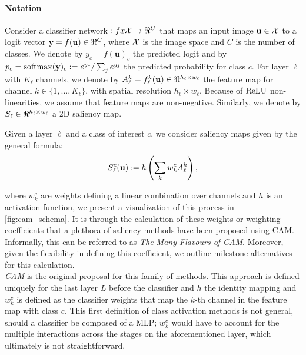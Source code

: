 \paragraph{Notation}
\label{sec:oc_notation}
Consider a classifier network $:fx \cX \to \real^C$ that maps an input image $\mathbf{u} \in \mathcal{X}$ to a 
logit vector $\vy = f(\mathbf{u}) \in \real^C$, where $\mathcal{X}$ is the image space and $C$ is the number 
of classes. We denote by $y_c = f(\mathbf{u})_c$ the predicted logit and by $p_c = \operatorname{softmax}(\mathbf{y})_c 
\mathrel{:=} e^{y_c} / \sum_j e^{y_j}$ the predicted probability for class $c$. For layer $\ell$ 
with $K_\ell$ channels, we denote by $A^k_\ell = f^k_\ell(\mathbf{u}) \in \real^{h_\ell \times w_\ell}$ 
the feature map for channel $k \in \{1,\dots,K_\ell\}$, with spatial resolution $h_\ell \times 
w_\ell$. Because of ${\operatorname{ReLU}}$ non-linearities, we assume that feature maps are non-negative. 
Similarly, we denote by $S_\ell \in \real^{h_\ell \times w_\ell}$ a 2D saliency map.

\label{sec:oc_back}
Given a layer $\ell$ and a class of interest $c$, we consider saliency maps given by the general 
formula: \\
\begin{equation}
	S^c_\ell(\mathbf{u}) \mathrel{:=} h \left( \sum_k w^c_k A^k_\ell \right),
\label{eq:sal}
\end{equation}

where $w^c_k$ are weights defining a linear combination over channels and $h$ is an activation 
function, we present a visualization of this process in \autoref{fig:cam_schema}. It is through the 
calculation of these weights or weighting coefficients that a plethora of saliency methods have 
been proposed using CAM. Informally, this can be referred to as \emph{The Many Flavours of CAM}.
Moreover, given the flexibility in defining this coefficient, we outline milestone alternatives for 
this calculation.\\



\noindent \emph{CAM} \autocite{zhou2016learning} is the original proposal for this family of 
methods. This approach is defined uniquely for the last layer $L$ before the classifier and $h$ the 
identity mapping and $w^c_k$ is defined as the classifier weights that map the $k$-th channel in 
the feature map with class $c$. This first definition of class activation methods is not general, 
should a classifier be composed of a MLP; $w^c_k$ would have to account for the multiple 
interactions across the stages on the aforementioned layer, which ultimately is not 
straightforward. \\
 
